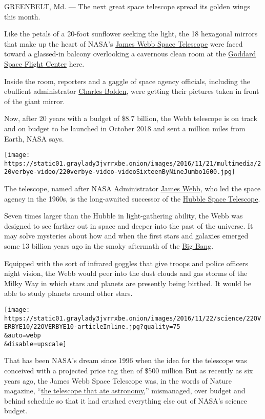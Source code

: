 GREENBELT, Md. --- The next great space telescope spread its golden
wings this month.

Like the petals of a 20-foot sunflower seeking the light, the 18
hexagonal mirrors that make up the heart of NASA's
\href{http://www.jwst.nasa.gov/}{James Webb Space Telescope} were faced
toward a glassed-in balcony overlooking a cavernous clean room at the
\href{https://www.nasa.gov/goddard}{Goddard Space Flight Center} here.

Inside the room, reporters and a gaggle of space agency officials,
including the ebullient administrator
\href{http://blogs.nasa.gov/bolden/}{Charles Bolden}, were getting their
pictures taken in front of the giant mirror.

Now, after 20 years with a budget of \$8.7 billion, the Webb telescope
is on track and on budget to be launched in October 2018 and sent a
million miles from Earth, NASA says.

\texttt{[image: https://static01.graylady3jvrrxbe.onion/images/2016/11/21/multimedia/220verbye-video/220verbye-video-videoSixteenByNineJumbo1600.jpg]}

The telescope, named after NASA Administrator
\href{http://www.nytimes3xbfgragh.onion/1992/03/29/us/james-webb-who-led-moon-program-dies-at-85.html}{James
Webb}, who led the space agency in the 1960s, is the long-awaited
successor of the
\href{http://www.nasa.gov/mission_pages/hubble/story/index.html}{Hubble
Space Telescope}.

Seven times larger than the Hubble in light-gathering ability, the Webb
was designed to see farther out in space and deeper into the past of the
universe. It may solve mysteries about how and when the first stars and
galaxies emerged some 13 billion years ago in the smoky aftermath of the
\href{https://science.nasa.gov/astrophysics/focus-areas/what-powered-the-big-bang}{Big
Bang}.

Equipped with the sort of infrared goggles that give troops and police
officers night vision, the Webb would peer into the dust clouds and gas
storms of the Milky Way in which stars and planets are presently being
birthed. It would be able to study planets around other stars.

\texttt{[image: https://static01.graylady3jvrrxbe.onion/images/2016/11/22/science/22OVERBYE10/22OVERBYE10-articleInline.jpg?quality=75\\\&auto=webp\\\&disable=upscale]}

That has been NASA's dream since 1996 when the idea for the telescope
was conceived with a projected price tag then of \$500 million But as
recently as six years ago, the James Webb Space Telescope was, in the
words of Nature magazine,
``\href{http://www.nature.com/news/2010/101027/full/4671028a.html}{the
telescope that ate astronomy},'' mismanaged, over budget and behind
schedule so that it had crushed everything else out of NASA's science
budget.

